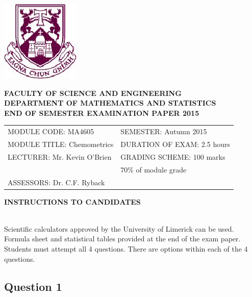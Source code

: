 \documentclass[a4paper,12pt]{article}
\begin{document}
\begin{center}
\includegraphics[scale=0.55]{image/shieldtransparent2}
\end{center}

\begin{center}
\vspace{1cm}
\large \bf {FACULTY OF SCIENCE AND ENGINEERING} \\[0.5cm]
\normalsize DEPARTMENT OF MATHEMATICS AND STATISTICS \\[1.25cm]
\large \bf {END OF SEMESTER EXAMINATION PAPER 2015} \\[1.5cm]
\end{center}

\begin{tabular}{ll}
MODULE CODE: MA4605 & SEMESTER: Autumn 2015 \\[1cm]
MODULE TITLE: Chemometrics& DURATION OF EXAM: 2.5 hours  \\[1cm]
LECTURER: Mr. Kevin O'Brien & GRADING SCHEME: 100 marks \\
& \phantom{GRADING SCHEME:} \footnotesize {70\% of module grade} \\[1cm]
ASSESSORS: Dr. C.F. Ryback &  \\[1cm]

\end{tabular}
\vspace{-0.5cm}
\begin{center}
{\bf INSTRUCTIONS TO CANDIDATES}
\end{center}

{\noindent \\ Scientific calculators approved by the University of Limerick can be used. \\
Formula sheet and statistical tables provided at the end of the exam paper.\\ Students must attempt all 4 questions. There are options within each of the 4 questions.}
\newpage
\subsection*{Question 1}
\end{document}
